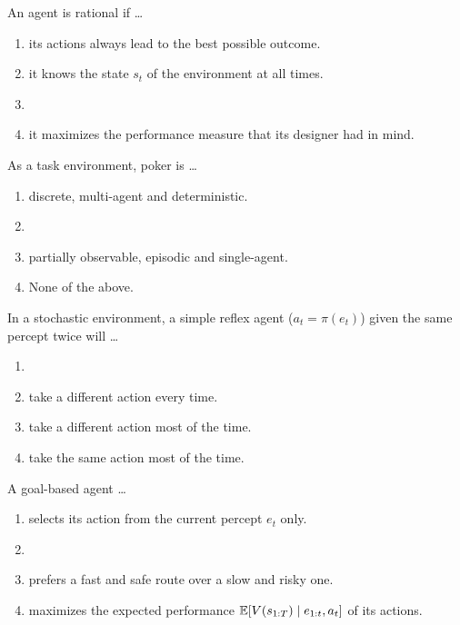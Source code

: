 \documentclass[11pt, a4paper]{exam}
\begin{document}
\begin{quiz}
    \item An agent is rational if \ldots
    \begin{enumerate}[label=$\bigcirc$]
        \item its actions always lead to the best possible outcome.
        \item it knows the state $s_t$ of the environment at all times.
        \item {}
        \item it maximizes the performance measure that its designer had in mind.
    \end{enumerate}

    \item As a task environment, poker is \ldots
    \begin{enumerate}[label=$\bigcirc$]
        \item discrete, multi-agent and deterministic.
        \item {}
        \item partially observable, episodic and single-agent.
        \item None of the above.
    \end{enumerate}

    \item In a stochastic environment, a simple reflex agent ($a_t = \pi(e_t)$) given the same percept twice will \ldots
    \begin{enumerate}[label=$\bigcirc$]
        \item {}
        \item take a different action every time.
        \item take a different action most of the time.
        \item take the same action most of the time.
    \end{enumerate}

    \item A goal-based agent \ldots
    \begin{enumerate}[label=$\bigcirc$]
        \item selects its action from the current percept $e_t$ only.
        \item {}
        \item prefers a fast and safe route over a slow and risky one.
        \item maximizes the expected performance $\mathbb{E}[V(s_{1:T}) \mid e_{1:t}, a_t]$ of its actions.
    \end{enumerate}


\end{quiz}
\end{document}
